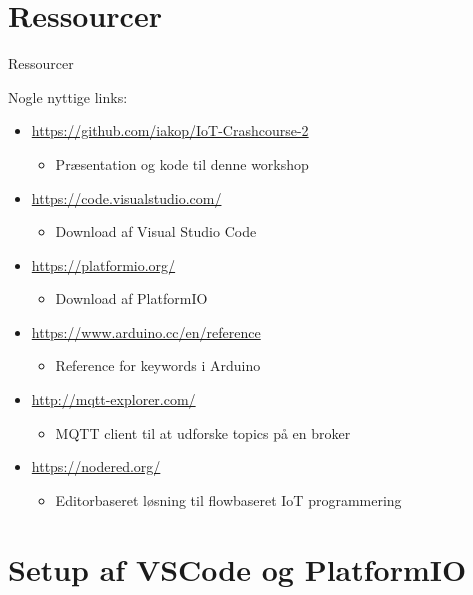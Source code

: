 \documentclass[aspectratio=169]{beamer}
\begin{document}
\section{Ressourcer}
\begin{frame}{Ressourcer}
	\begin{textBox}
	Nogle nyttige links:
		\begin{itemize}
			\item \url{https://github.com/iakop/IoT-Crashcourse-2}
			\begin{itemize}
				\item Præsentation og kode til denne workshop
			\end{itemize}
			\item \url{https://code.visualstudio.com/}
			\begin{itemize}
				\item Download af Visual Studio Code
			\end{itemize}
			\item \url{https://platformio.org/}
			\begin{itemize}
				\item Download af PlatformIO
			\end{itemize}
			\item \url{https://www.arduino.cc/en/reference}
			\begin{itemize}
				\item Reference for keywords i Arduino
			\end{itemize}
			\item \url{http://mqtt-explorer.com/}
			\begin{itemize}
				\item MQTT client til at udforske topics på en broker
			\end{itemize}
			\item \url{https://nodered.org/}
			\begin{itemize}
				\item Editorbaseret løsning til flowbaseret IoT programmering
			\end{itemize}
		\end{itemize}
	\end{textBox}
\end{frame}

\section{Setup af VSCode og PlatformIO}
\begin{frame}
\end{frame}
\end{document}
